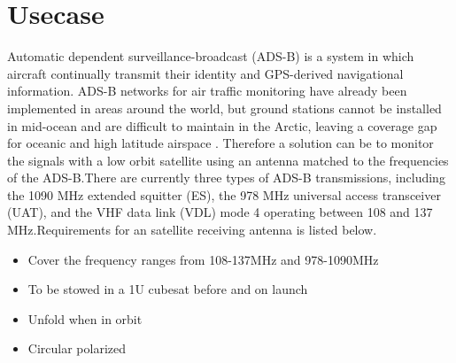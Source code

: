 \chapter{Usecase}\label{ch:usecase}

Automatic dependent surveillance-broadcast (ADS-B) is a system in which aircraft continually transmit their identity and GPS-derived navigational information. ADS-B networks for air traffic monitoring have already been implemented in areas around the world, but ground stations cannot be installed in mid-ocean and are difficult to maintain in the Arctic, leaving a coverage gap for oceanic and high latitude airspace \citep{FlyingLab}. Therefore a solution can be to monitor the signals with a low orbit satellite using an antenna matched to the frequencies of the ADS-B.There are currently three types of ADS-B transmissions, including the 1090 MHz extended squitter (ES), the 978 MHz universal access transceiver (UAT), and the VHF data link (VDL) mode 4 operating between 108 and 137 MHz.Requirements for an satellite receiving antenna is listed below.
\begin{itemize}
  \item Cover the frequency ranges from 108-137MHz and 978-1090MHz
  \item To be stowed in a 1U cubesat before and on launch
  \item Unfold when in orbit
  \item Circular polarized
\end{itemize}